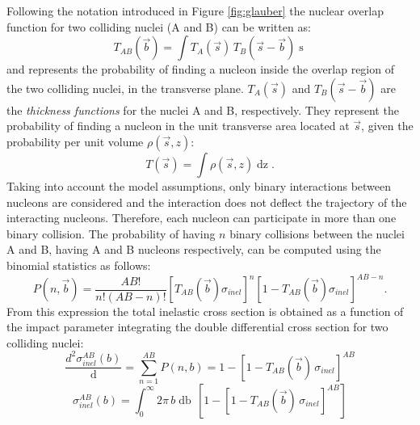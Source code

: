 Following the notation introduced in Figure \ref{fig:glauber} the nuclear overlap function for two colliding
nuclei (A and B) can be written as:
\begin{equation} \label{eq:overlap}
    T_{AB}(\vec{b}) = \int T_{A}(\vec{s})\,T_{B}(\vec{s}-\vec{b}) \mathop{d^{2}s}
\end{equation}
and represents the probability of finding a nucleon inside the 
overlap region of the two colliding nuclei, in the transverse plane.
$T_{A}(\vec{s})$ and $T_{B}(\vec{s}-\vec{b})$ are the \textit{thickness functions} for the nuclei A and B, respectively.
They represent the probability of finding a nucleon in the unit transverse area located at 
$\vec{s}\xspace$, given the probability per unit volume $\rho(\vec{s},z)$:
\begin{equation} \label{eq:thickfunc}
    T(\vec{s}) = \int \rho(\vec{s},z) \mathop{dz}.
\end{equation}
Taking into account the model assumptions, only binary interactions between nucleons are considered 
and the interaction does not deflect the trajectory of the interacting nucleons.
Therefore, each nucleon can participate in more than one binary collision. 
The probability of having $n$ binary collisions between the nuclei A and B, having A and B nucleons
respectively, can be computed using the binomial statistics as follows:
\begin{equation} \label{eq:ABprob}
    P(n,\vec{b}) = \frac{AB!}{n! (AB-n)!}[T_{AB}(\vec{b})\sigma_{inel}]^{n} [1-T_{AB}(\vec{b})\sigma_{inel}]^{AB-n}.
\end{equation}
From this expression the total inelastic cross section is obtained as a function of the impact
parameter integrating the double differential cross section for two colliding nuclei:
\begin{equation} \label{eq:doublediff}
    \frac{d^{2} \sigma^{AB}_{inel}(b)}{\mathop{db^{2}}} = \sum_{n=1}^{AB} P(n,b)
    = 1 - [1-T_{AB}(\vec{b})\, \sigma_{inel}]^{AB}
\end{equation}
\begin{equation}
    \sigma^{AB}_{inel}(b) = \int_{0}^{\infty} 2 \pi \, b \mathop{db} \,
    [1 - [1-T_{AB}(\vec{b})\, \sigma_{inel}]^{AB}]
\end{equation}


